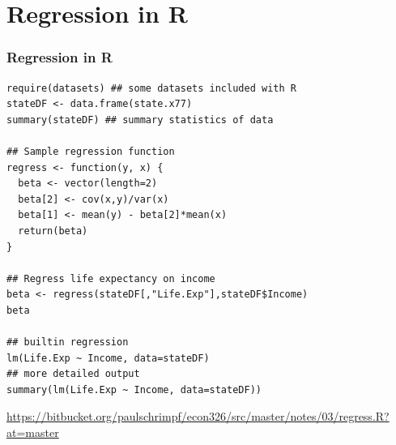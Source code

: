 

\section{Regression in R}


\begin{frame} \frametitle{Regression in R}
  \begin{lstlisting}
require(datasets) ## some datasets included with R
stateDF <- data.frame(state.x77)
summary(stateDF) ## summary statistics of data

## Sample regression function
regress <- function(y, x) {
  beta <- vector(length=2)
  beta[2] <- cov(x,y)/var(x)
  beta[1] <- mean(y) - beta[2]*mean(x)
  return(beta)
}

## Regress life expectancy on income
beta <- regress(stateDF[,"Life.Exp"],stateDF$Income)
beta

## builtin regression 
lm(Life.Exp ~ Income, data=stateDF)
## more detailed output
summary(lm(Life.Exp ~ Income, data=stateDF))
  \end{lstlisting}
  \url{https://bitbucket.org/paulschrimpf/econ326/src/master/notes/03/regress.R?at=master}
\end{frame}
\clearpage
